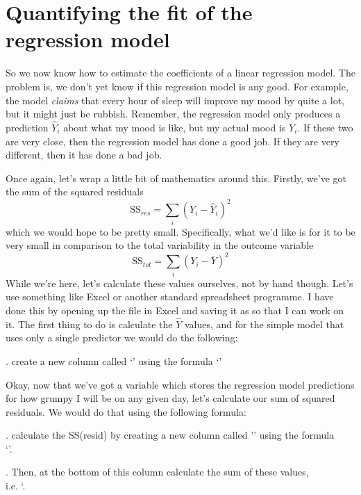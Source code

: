 \section{Quantifying the fit of the regression model~\label{sec:r2}}

So we now know how to estimate the coefficients of a linear regression model. The problem is, we don't yet know if this regression model is any good. For example, the  model {\it claims} that every hour of sleep will improve my mood by quite a lot, but it might just be rubbish. Remember, the regression model only produces a prediction $\hat{Y}_i$ about what my mood is like, but my actual mood is $Y_i$. If these two are very close, then the regression model has done a good job. If they are very different, then it has done a bad job. 


Once again, let's wrap a little bit of mathematics around this. Firstly, we've got the sum of the squared residuals
$$
\mbox{SS}_{res} = \sum_i (Y_i - \hat{Y}_i)^2
$$
which we would hope to be pretty small. Specifically, what we'd like is for it to be very small in comparison to the total variability in the outcome variable
$$
\mbox{SS}_{tot} = \sum_i (Y_i - \bar{Y})^2
$$
While we're here, let's calculate these values ourselves, not by hand though. Let's use something like Excel or another standard spreadsheet programme. I have done this by opening up the  file in Excel and saving it as  so that I can work on it. The first thing to do is calculate the $\hat{Y}$ values, and for the simple model that uses only a single predictor we would do the following:

. create a new column called `' using the formula `'

Okay, now that we've got a variable which stores the regression model predictions for how grumpy I will be on any given day, let's calculate our sum of squared residuals. We would do that using the following formula: 

. calculate the SS(resid) by creating a new column called '' using the formula \\`'.

. Then, at the bottom of this column calculate the sum of these values, \\i.e. `. 

